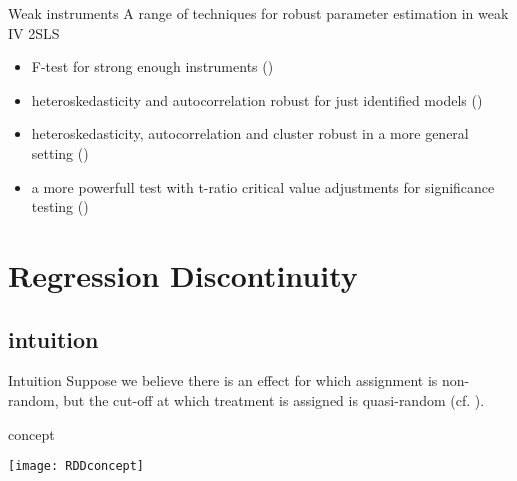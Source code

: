 \documentclass[aspectratio=169]{beamer}
\begin{document}
		\begin{frame}{Weak instruments}
			A range of techniques for robust parameter estimation in weak IV 2SLS \\ \vspace*{.15cm}
			\begin{itemize}
			 \item<1-> F-test for strong enough instruments (\cite{Stock2003})
			 \item<2-> heteroskedasticity and autocorrelation robust for just identified models (\cite{Chernozhukov2008})
			 \item<3-> heteroskedasticity, autocorrelation and cluster robust in a more general setting (\cite{Montiel2013})
			 \item<4-> a more powerfull test with t-ratio critical value adjustments for significance testing (\cite{Lee2020})
		 	\end{itemize}
			\vspace*{.15cm}
		\end{frame}

\section{Regression Discontinuity}
	\subsection{intuition}
		\begin{frame}{Intuition}
			Suppose we believe there is an effect for which assignment is non-random, but the cut-off at which treatment is assigned is quasi-random (cf. \cite{Thistlewaite2016}). \\ \vspace*{.15cm}
			\begin{center}
			\end{center}
		\end{frame}

		\begin{frame}{concept}
			\begin{center}
				\texttt{[image: RDDconcept]}
			\end{center}
		\end{frame}
\end{document}
